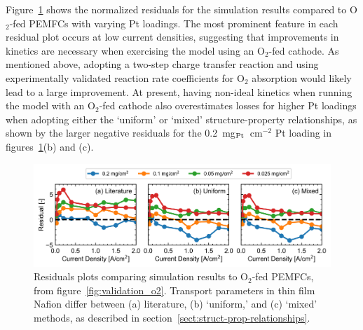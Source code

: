 \documentclass[final,3p,times,onecolumn]{elsarticle}    %
\newcommand{\crr}[1]{\color{red} #1 \color{black}} %
\begin{document}
\crr{Figure~\ref{fig:residuals-o2} shows the normalized residuals for the simulation results compared to O$_2$-fed PEMFCs with varying Pt loadings. The most prominent feature in each residual plot occurs at low current densities, suggesting that improvements in kinetics are necessary when exercising the model using an O$_2$-fed cathode. As mentioned above, adopting a two-step charge transfer reaction and using experimentally validated reaction rate coefficients for O$_2$ absorption would likely lead to a large improvement. At present, having non-ideal kinetics when running the model with an O$_2$-fed cathode also overestimates losses for higher Pt loadings when adopting either the `uniform' or `mixed' structure-property relationships, as shown by the larger negative residuals for the 0.2~mg$_{\rm Pt}$~cm$^{-2}$ Pt loading in figures~\ref{fig:residuals-o2}(b) and (c).}
\begin{figure}[!t]
    \centering
    \includegraphics[width=6.436in]{figures/residuals-o2-6_436in.png}
    \crr{\caption{Residuals plots comparing simulation results to O$_2$-fed PEMFCs, from figure~\ref{fig:validation_o2}. Transport parameters in thin film Nafion differ between (a) literature, (b) `uniform,' and (c) `mixed' methods, as described in section~\ref{sect:struct-prop-relationships}.}}
    \label{fig:residuals-o2}
\end{figure}
\end{document}
